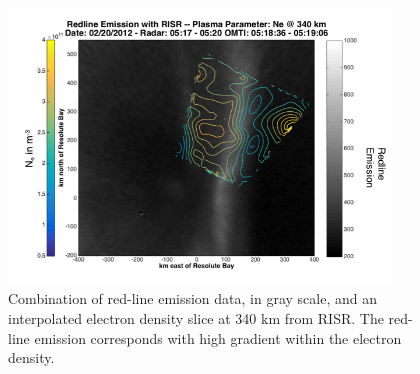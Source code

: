 \begin{figure}[!t]
\centering
\includegraphics[width=4.0in]{risrfusion}
\caption{Combination of red-line emission data, in gray scale, and an interpolated electron density slice at 340 km from RISR. The red-line emission corresponds with high gradient within the electron density.}
\label{fig:risrfusion}
\end{figure}
%
